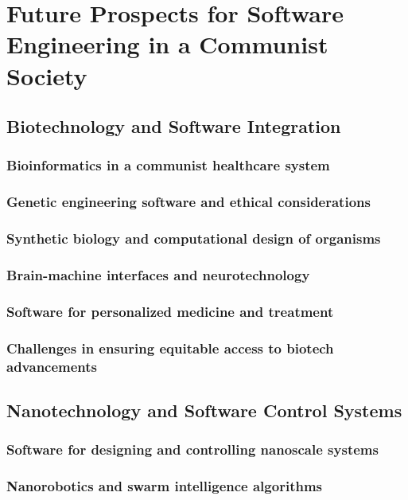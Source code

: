 \chapter{Future Prospects for Software Engineering in a Communist Society}

\newpage

\section{Biotechnology and Software Integration}
\subsection{Bioinformatics in a communist healthcare system}
\subsection{Genetic engineering software and ethical considerations}
\subsection{Synthetic biology and computational design of organisms}
\subsection{Brain-machine interfaces and neurotechnology}
\subsection{Software for personalized medicine and treatment}
\subsection{Challenges in ensuring equitable access to biotech advancements}

\newpage

\section{Nanotechnology and Software Control Systems}
\subsection{Software for designing and controlling nanoscale systems}
\subsection{Nanorobotics and swarm intelligence algorithms}
